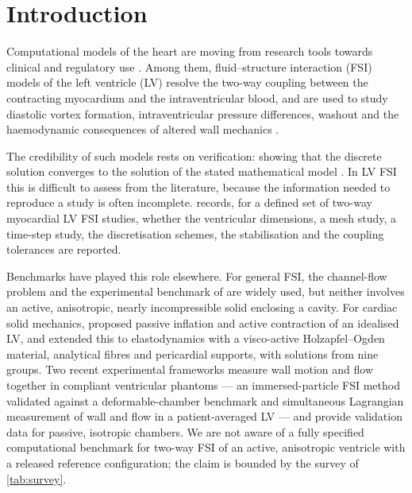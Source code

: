 \section{Introduction}\label{sec:intro}

Computational models of the heart are moving from research tools towards
clinical and regulatory use \citep{Quarteroni2017,Chabiniok2016}. Among
them, fluid--structure interaction (FSI) models of the left ventricle (LV)
resolve the two-way coupling between the contracting myocardium and the
intraventricular blood, and are used to study diastolic vortex formation,
intraventricular pressure differences, washout and the haemodynamic
consequences of altered wall mechanics \citep{Mittal2016}.

The credibility of such models rests on verification: showing that the
discrete solution converges to the solution of the stated mathematical
model \citep{Roache1998,Oberkampf2010}. In LV FSI this is difficult to
assess from the literature, because the information needed to reproduce a
study is often incomplete.  records, for a defined set of
two-way myocardial LV FSI studies, whether the ventricular dimensions, a
mesh study, a time-step study, the discretisation schemes, the
stabilisation and the coupling tolerances are reported.

Benchmarks have played this role elsewhere. For general FSI, the
\citet{TurekHron2006} channel-flow problem and the experimental benchmark
of \citet{Hessenthaler2017} are widely used, but neither involves an
active, anisotropic, nearly incompressible solid enclosing a cavity. For
cardiac solid mechanics, \citet{Land2015} proposed passive inflation and
active contraction of an idealised LV, and \citet{Arostica2025} extended
this to elastodynamics with a visco-active Holzapfel--Ogden material,
analytical fibres and pericardial supports, with solutions from nine
groups. Two recent experimental frameworks measure wall motion and flow
together in compliant ventricular phantoms --- an immersed-particle FSI
method validated against a deformable-chamber benchmark
\citep{Monteleone2026} and simultaneous Lagrangian measurement of wall and
flow in a patient-averaged LV \citep{Hadar2026} --- and provide validation
data for passive, isotropic chambers. We are not aware of a fully
specified computational benchmark for two-way FSI of an active, anisotropic
ventricle with a released reference configuration; the claim is bounded by
the survey of \cref{tab:survey}.

